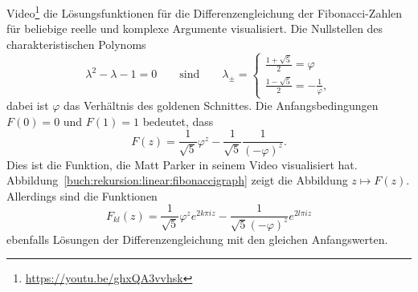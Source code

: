 %
%
%
Video\footnote{\url{https://youtu.be/ghxQA3vvhsk}} die Lösungsfunktionen
für die Differenzengleichung der Fibonacci-Zahlen für beliebige
reelle und komplexe Argumente visualisiert.
Die Nullstellen des charakteristischen Polynoms
\[
\lambda^2-\lambda-1=0
\qquad
\text{sind}
\qquad
\lambda_\pm = \begin{cases}
\displaystyle
\frac{1+\sqrt{5}}{2}=\varphi
\\[8pt]
\displaystyle
\frac{1-\sqrt{5}}{2}=-\frac{1}{\varphi},
\end{cases}
\]
dabei ist $\varphi$ das Verhältnis des goldenen Schnittes.
%
%
Die Anfangsbedingungen $F(0)=0$ und $F(1)=1$ bedeutet, dass
\begin{equation}
F(z) = \frac{1}{\sqrt{5}}\varphi^z - \frac{1}{\sqrt{5}}\frac{1}{(-\varphi)^z}.
\label{buch:rekursion:linear:fibonaccifunktion}
\end{equation}
Dies ist die Funktion, die Matt Parker in seinem Video visualisiert hat.
Abbildung~\eqref{buch:rekursion:linear:fibonaccigraph} zeigt die Abbildung
$z\mapsto F(z)$.
Allerdings sind die Funktionen
\[
F_{kl}(z)
=
\frac{1}{\sqrt{5}}
\varphi^ze^{2k\pi iz}
-
\frac{1}{\sqrt{5}(-\varphi)^z} e^{2l\pi iz}
\]
ebenfalls Lösungen der Differenzengleichung mit den gleichen 
Anfangswerten.



